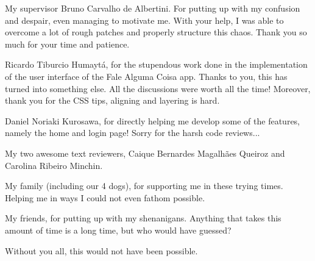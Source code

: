 \documentclass[
	12pt,				%
	openright,			%
	oneside,			%
	a4paper,			%
	hyphens,			%
	english,			%
	english				%
]{abntex2}
\begin{document}

	\frenchspacing

	\pretextual

	\imprimircapa

	\imprimirfolhaderosto*
	
    
    
    \begin{agradecimentos}
    My supervisor Bruno Carvalho de Albertini. For putting up with my confusion and despair, even managing to motivate me. With your help, I was able to overcome a lot of rough patches and properly structure this chaos. Thank you so much for your time and patience.

    Ricardo Tiburcio Humaytá, for the stupendous work done in the implementation of the user interface of the Fale Alguma Coisa app. Thanks to you, this has turned into something else. All the discussions were worth all the time! Moreover, thank you for the CSS tips, aligning and layering is hard.
    
    Daniel Noriaki Kurosawa, for directly helping me develop some of the features, namely the home and login page! Sorry for the harsh code reviews...
    
    My two awesome text reviewers, Caique Bernardes Magalhães Queiroz and Carolina Ribeiro Minchin.

    My family (including our 4 dogs), for supporting me in these trying times. Helping me in ways I could not even fathom possible.
    
    My friends, for putting up with my shenanigans. Anything that takes this amount of time is a long time, but who would have guessed?
    
    Without you all, this would not have been possible.
    \end{agradecimentos}
    
\end{document}
